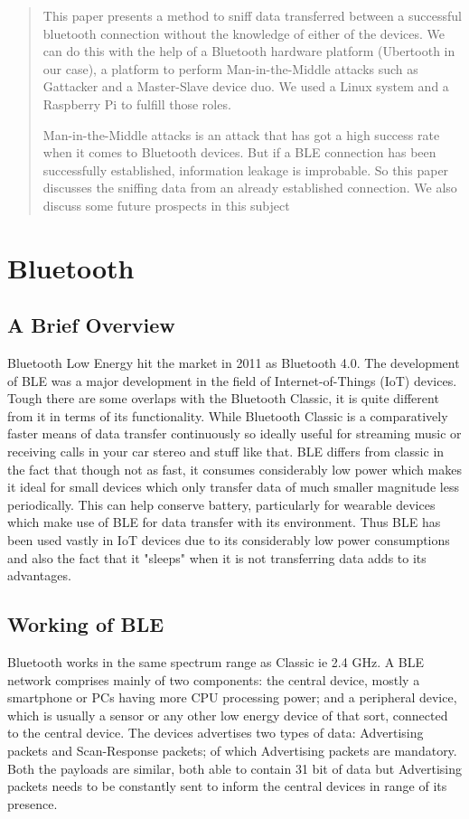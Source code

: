 \documentclass[conference]{IEEEtran}
\begin{document}
\begin{abstract}
This paper presents a method to sniff data transferred between a successful bluetooth connection without the knowledge of either of the devices. We can do this with the help of a Bluetooth hardware platform (Ubertooth in our case), a platform to perform Man-in-the-Middle attacks such as Gattacker and a Master-Slave device duo. We used a Linux system and a Raspberry Pi to fulfill those roles.

Man-in-the-Middle attacks is an attack that has got a high success rate when it comes to Bluetooth devices. But if a BLE connection has been successfully established, information leakage is improbable. So this paper discusses the sniffing data from an already established connection. We also discuss some future prospects in this subject
\end{abstract}

\section{Bluetooth}
\subsection{A Brief Overview}
Bluetooth Low Energy hit the market in 2011 as Bluetooth 4.0. The development of BLE was a major development in the field of Internet-of-Things (IoT) devices. Tough there are some overlaps with the Bluetooth Classic, it is quite different from it in terms of its functionality. While Bluetooth Classic is a comparatively faster means of data transfer continuously so ideally useful for streaming music or receiving calls in your car stereo and stuff like that. BLE differs from classic in the fact that though not as fast, it consumes considerably low power which makes it ideal for small devices which only transfer data of much smaller magnitude less periodically. This can help conserve battery, particularly for wearable devices which make use of BLE for data transfer with its environment. Thus BLE has been used vastly in IoT devices due to its considerably low power consumptions and also the fact that it "sleeps" when it is not transferring data adds to its advantages.

\subsection{Working of BLE}
Bluetooth works in the same spectrum range as Classic ie 2.4 GHz. A BLE network comprises mainly of two components: the central device, mostly a smartphone or PCs having more CPU processing power; and a peripheral device, which is usually a sensor or any other low energy device of that sort, connected to the central device. The devices advertises two types of data: Advertising packets and Scan-Response packets; of which Advertising packets are mandatory. Both the payloads are similar, both able to contain 31 bit of data but Advertising packets needs to be constantly sent to inform the central devices in range of its presence. 
 
\end{document}
